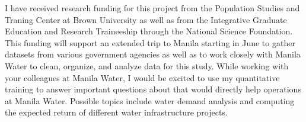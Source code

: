 \documentclass{article}
\begin{document}
I have received research funding for this project from the Population Studies and Traning Center at Brown University as well as from the Integrative Graduate Education and Research Traineeship through the National Science Foundation.  This funding will support an extended trip to Manila starting in June to gather datasets from various government agencies as well as to work closely with Manila Water to clean, organize, and analyze data for this study.  While working with your colleagues at Manila Water, I would be excited to use my quantitative training to answer important questions about that would directly help operations at Manila Water.  Possible topics include water demand analysis and computing the expected return of different water infrastructure projects.

%
%
\end{document}
